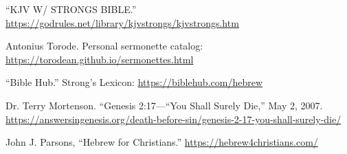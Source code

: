 {\footnotesize
\begin{thebibliography}{99}
	
	 ``KJV W/ STRONGS BIBLE.'' \url{https://godrules.net/library/kjvstrongs/kjvstrongs.htm}
	
	 Antonius Torode. Personal sermonette catalog: \url{https://torodean.github.io/sermonettes.html}
	
	 ``Bible Hub.'' Strong's Lexicon: \url{https://biblehub.com/hebrew}
	
	 Dr. Terry Mortenson. ``Genesis 2:17—“You Shall Surely Die,'' May 2, 2007.  \url{https://answersingenesis.org/death-before-sin/genesis-2-17-you-shall-surely-die/}
	
	 John J. Parsons, ``Hebrew for Christians.'' \url{https://hebrew4christians.com/}
	
\end{thebibliography}
}